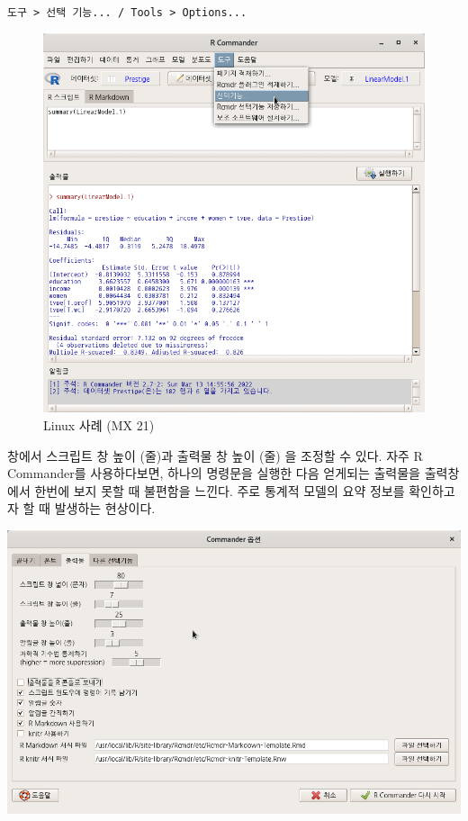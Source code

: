 \documentclass[
]{book}
\begin{document}
\texttt{도구\ \textgreater{}\ 선택\ 기능...\ /\ Tools\ \textgreater{}\ Options...}

\begin{figure}
\centering
\includegraphics{fig/tools-options-01.png}
\caption{Linux 사례 (MX 21)}
\end{figure}

창에서 스크립트 창 높이 (줄)과 출력물 창 높이 (줄) 을 조정할 수 있다. 자주 R Commander를 사용하다보면, 하나의 명령문을 실행한 다음 얻게되는 출력물을 출력창에서 한번에 보지 못할 때 불편함을 느낀다. 주로 통계적 모델의 요약 정보를 확인하고자 할 때 발생하는 현상이다.

\includegraphics{fig/tools-options-02.png}
\end{document}
